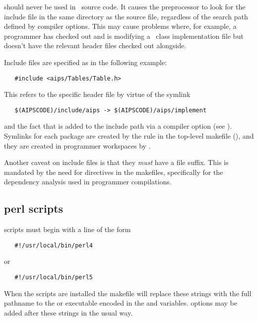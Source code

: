 \noindent
should never be used in \aipspp\ source code.  It causes the preprocessor to
look for the include file in the same directory as the source file, regardless
of the search path defined by  compiler options.  This may cause
problems where, for example, a programmer has checked out and is modifying a
\cplusplus\ class implementation file but doesn't have the relevant header
files checked out alongside.

Include files are specified as in the following example:

\begin{verbatim}
   #include <aips/Tables/Table.h>
\end{verbatim}

\noindent
This refers to the specific header file
 by virtue of the symlink

\begin{verbatim}
   $(AIPSCODE)/include/aips -> $(AIPSCODE)/aips/implement
\end{verbatim}

\noindent
and the fact that  is added to the include path via
a  compiler option (see ).  Symlinks for each
package are created by the  rule in the top-level makefile
(), and they are created in programmer
workspaces by .

Another caveat on include files is that they {\em must} have a 
file suffix.  This is mandated by the need for  directives in the
makefiles, specifically for the dependency analysis used in programmer
compilations.

\subsection*{perl scripts}

 scripts must begin with a line of the form

\begin{verbatim}
   #!/usr/local/bin/perl4
\end{verbatim}

\noindent
or

\begin{verbatim}
   #!/usr/local/bin/perl5
\end{verbatim}

\noindent
When the scripts are installed the makefile will replace these strings with
the full pathname to the  or  executable encoded
in the  and   variables.  
options may be added after these strings in the usual way.

